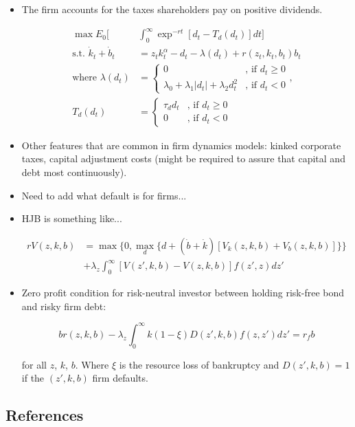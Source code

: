 \documentclass{article}
\begin{document}
\begin{itemize}
\item The firm accounts for the taxes shareholders pay on positive dividends.

\begin{align*}
\max E_0 \Bigg[& \int_0^\infty \exp^{-rt} [d_t - T_d(d_t)] dt\Bigg]\\
\text{s.t. } \dot k_t + \dot b_t &= z_t k_t^\alpha - d_t - \lambda(d_t) + r(z_t, k_t, b_t) b_t\\
\text{where } \lambda(d_t) &= \begin{cases} 0 & \text{, if } d_t \ge 0 \\ \lambda_0 + \lambda_1 |d_t| + \lambda_2 d_t^2 & \text{, if } d_t < 0 \end{cases},\\
T_d(d_t) &= \begin{cases} \tau_d d_t & \text{, if } d_t \ge 0 \\ 0 & \text{, if } d_t < 0 \end{cases}
\end{align*}

\item Other features that are common in firm dynamics models: kinked corporate taxes, capital adjustment costs (might be required to assure that capital and debt most continuously). 

\item Need to add what default is for firms...

\item HJB is something like...

\begin{align*}
r V(z, k, b) &= \max \{ 0, \max_{d} \{d + (\dot b + \dot k)[V_k(z, k, b) + V_b(z, k, b)] \}\} \\
&+ \lambda_z \int_0^\infty [V(z', k, b) - V(z, k, b)]f(z', z) dz'
\end{align*}

\item Zero profit condition for risk-neutral investor between holding risk-free bond and risky firm debt:

$$
b r(z, k, b) - \lambda_z \int_0^\infty k (1 - \xi)D(z',k, b) f(z,z') dz'= r_f b
$$

for all $z$, $k$, $b$. Where $\xi$ is the resource loss of bankruptcy and $D(z', k, b) = 1$ if the $(z', k, b)$ firm defaults.

\end{itemize}

\subsection*{References}
\end{document}
